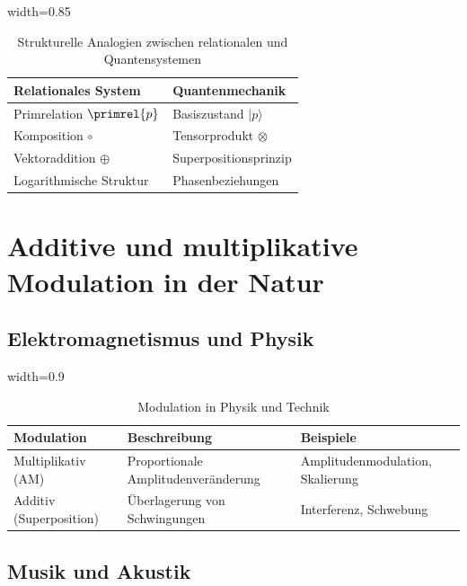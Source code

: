 	\begin{table}[htbp]
		\centering
		\begin{adjustbox}{width=0.85\textwidth}
			\begin{tabular}{ll}
				\toprule
				\textbf{Relationales System} & \textbf{Quantenmechanik} \\
				\midrule
				Primrelation $\primrel{p}$ & Basiszustand $|p\rangle$ \\
				Komposition $\circ$ & Tensorprodukt $\otimes$ \\
				Vektoraddition $\oplus$ & Superpositionsprinzip \\
				Logarithmische Struktur & Phasenbeziehungen \\
				\bottomrule
			\end{tabular}
		\end{adjustbox}
		\caption{Strukturelle Analogien zwischen relationalen und Quantensystemen}
		\label{tab:quantenanalogien}
	\end{table}
	
	\section{Additive und multiplikative Modulation in der Natur}
	
	\subsection{Elektromagnetismus und Physik}
	
	\begin{table}[htbp]
		\centering
		\begin{adjustbox}{width=0.9\textwidth}
			\begin{tabular}{lll}
				\toprule
				\textbf{Modulation} & \textbf{Beschreibung} & \textbf{Beispiele} \\
				\midrule
				Multiplikativ (AM) & Proportionale Amplitudenveränderung & Amplitudenmodulation, Skalierung \\
				Additiv (Superposition) & Überlagerung von Schwingungen & Interferenz, Schwebung \\
				\bottomrule
			\end{tabular}
		\end{adjustbox}
		\caption{Modulation in Physik und Technik}
		\label{tab:modulation}
	\end{table}
	
	\subsection{Musik und Akustik}
	
